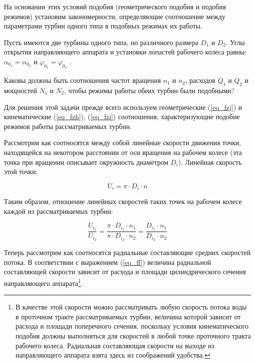 На основании этих условий подобия (геометрического подобия и подобия режимов) установим закономерности, определяющие соотношение между параметрами турбин одного типа в подобных режимах их работы.

\vspace{1 cm}

Пусть имеются две турбины одного типа, но различного размера $D_1$ и $D_2$. Углы открытия направляющего аппарата и установки лопастей рабочего колеса равны: $\alpha_{0_1} = \alpha_{0_2}$ и $\varphi_{0_1} = \varphi_{0_2}$ .

Каковы должны быть соотношения частот вращения $n_1$ и $n_2$, расходов $Q_1$ и $Q_2$ и мощностей $N_1$ и $N_2$, чтобы режимы работы обеих турбин были подобными?

\vspace{0.5cm}

Для решения этой задачи прежде всего используем геометрические (\ref{eq_fzj}) и кинематические (\ref{eq_fzh}), (\ref{eq_fzi}) соотношения, характеризующие подобие режимов работы рассматриваемых турбин.

Рассмотрим как соотносятся между собой линейные скорости движения точки, находящейся на некотором расстоянии от оси вращения на рабочем колесе (эта точка при вращении описывает окружность диаметром $D_i$). Линейная скорость этой точки:

$$
   U_i = \pi \cdot D_i \cdot n
$$

Таким образом, отношение линейных скоростей таких точек на рабочем колесе каждой из рассматриваемых турбин:

\begin{equation}
\label{eq_fzk}
   \frac{U_{i_1}}{U_{i_2}} = \frac{\pi \cdot D_{i_1} \cdot n_1}{\pi \cdot D_{i_2} \cdot n_2} = \frac{D_{i_1} \cdot n_1}{D_{i_2} \cdot n_2}
\end{equation}

Теперь рассмотрим как соотносятся радиальные составляющие средних скоростей потока. В соответствии с выражением (\ref{eq_ff}) величина радиальной составляющей скорости зависит от расхода и площади цилиндрического сечения направляющего аппарата\footnote{В качестве этой скорости можно рассматривать любую скорость потока воды в проточном тракте рассматриваемых турбин, величина которой зависит от расхода и площади поперечного сечения, поскольку условия кинематического подобия должны выполняться для скоростей в любой точке проточного тракта рабочего колеса. Радиальная составляющая скорости на выходе из направляющего аппарата взята здесь из соображений удобства.}.


